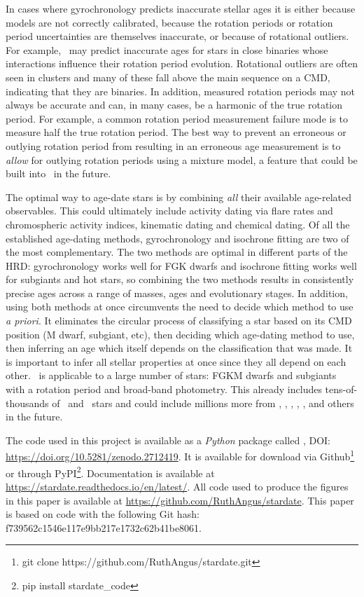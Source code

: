 In cases where gyrochronology predicts inaccurate stellar ages it is either
because models are not correctly calibrated, because the rotation periods or
rotation period uncertainties are themselves inaccurate, or because of
rotational outliers.
For example, \sd\ may predict inaccurate ages for stars in close binaries
whose interactions influence their rotation period evolution.
Rotational outliers are often seen in clusters \citep[see \eg][]{douglas2016,
rebull2016, douglas2017, rebull2017} and many of these fall above the main
sequence on a CMD, indicating that they are binaries.
In addition, measured rotation periods may not always be accurate and can, in
many cases, be a harmonic of the true rotation period.
For example, a common rotation period measurement failure mode is to measure
half the true rotation period.
The best way to prevent an erroneous or outlying rotation period from
resulting in an erroneous age measurement is to {\it allow} for outlying
rotation periods using a mixture model, a feature that could be built into
\sd\ in the future.

The optimal way to age-date stars is by combining {\it all} their available
age-related observables.
This could ultimately include activity dating via flare rates and
chromospheric activity indices, kinematic dating and chemical dating.
Of all the established age-dating methods, gyrochronology and isochrone
fitting are two of the most complementary.
The two methods are optimal in different parts of the HRD:
gyrochronology works well for FGK dwarfs and isochrone fitting works well for
subgiants and hot stars, so combining the two methods results in consistently
precise ages across a range of masses, ages and evolutionary stages.
In addition, using both methods at once circumvents the need to decide which
method to use {\it a priori}.
It eliminates the circular process of classifying a star based on its CMD
position (M dwarf, subgiant, etc), then deciding which age-dating method to
use, then inferring an age which itself depends on the classification that was
made.
It is important to infer all stellar properties at once since they all depend
on each other.
\sd\ is applicable to a large number of stars: FGKM dwarfs and subgiants with
a rotation period and broad-band photometry.
This already includes tens-of-thousands of \kepler\ and \ktwo\ stars and could
include millions more from \tess, \lsst, \wfirst, \plato, \gaia, and others in
the future.

The code used in this project is available as a {\it Python} package called
\sd, DOI: \url{ https://doi.org/10.5281/zenodo.2712419}.
It is available for download via Github\footnote{git clone
https://github.com/RuthAngus/stardate.git} or through
PyPI\footnote{pip install stardate\_code}.
Documentation is available at \url{https://stardate.readthedocs.io/en/latest/}.
All code used to produce the figures in this paper is available at
\url{https://github.com/RuthAngus/stardate}.
This paper is based on code with the following Git hash:
f739562c1546e117e9bb217e1732c62b41be8061.
